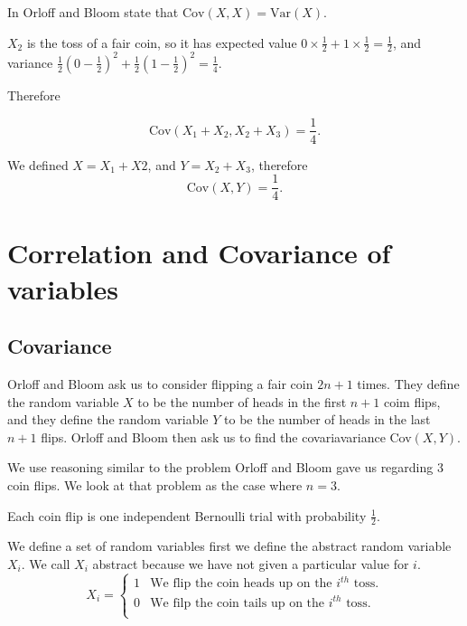 \documentclass[a4paper,11pt]{article}
\begin{document}
In \cite{reading7b} Orloff and Bloom state that
$\text{Cov}\left(X, X\right) = \text{Var}\left(X\right)$.

$X_2$ is the toss of a fair coin, so it has expected value
$0\times\frac{1}{2} + 1 \times\frac{1}{2} = \frac{1}{2}$,
and variance
$\frac{1}{2}\left(0 - \frac{1}{2}\right)^2 + \frac{1}{2}\left(1-\frac{1}{2}\right)^2 = \frac{1}{4}$.

Therefore

\begin{equation}
\text{Cov}\left(X_1 + X_2, X_2 + X_3 \right)
  = \frac{1}{4}.
\end{equation}

We defined $X=X_1+X2$, and $Y=X_2+X_3$, therefore
\begin{equation}
\text{Cov}\left(X, Y \right)
  = \frac{1}{4}.
\end{equation}

\section{Correlation and Covariance of variables}
\subsection{Covariance}

Orloff and Bloom ask us to consider
flipping a fair coin $2n + 1$ times.
They define the random variable $X$
to be the number of heads in the first 
$n+1$ coim flips, and they define the
random variable $Y$ to be the number of
heads in the last $n+1$ flips. Orloff
and Bloom then ask us to find the 
covariavariance Cov$\left(X,Y \right)$.

We use reasoning similar to the problem
Orloff and Bloom gave us regarding 3 coin
flips. We look at that problem as the case
where $n=3$.

Each coin flip is one independent Bernoulli
trial with probability $\frac{1}{2}$.

We define a set of random variables first we define the abstract random
variable $X_i$.  We call $X_i$ abstract because we have not given a particular
value for $i$.
\begin{equation}
 X_i = \begin{cases} 
 	1 & \mbox{We flip the coin heads up on the $i^{th}$ toss.} \\
 	0 & \mbox{We filp the coin tails up on the $i^{th}$ toss.} \\
 	\end{cases}
\end{equation}
\end{document}
